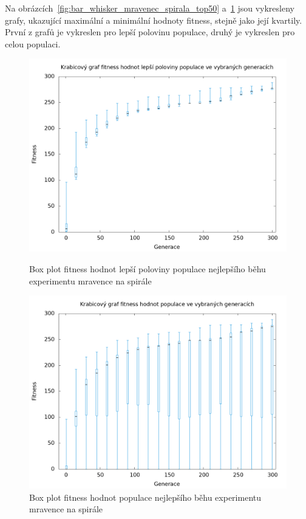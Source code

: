 Na obrázcích~\ref{fig:bar_whisker_mravenec_spirala_top50} a~\ref{fig:bar_whisker_mravenec_spirala} jsou vykresleny grafy, ukazující maximální a minimální hodnoty fitness, stejně jako její kvartily.
První z grafů je vykreslen pro lepší polovinu populace, druhý je vykreslen pro celou populaci.

\begin{figure}[h]
    \begin{minipage}[c]{0.48\linewidth}
        \includegraphics[width=\linewidth]{obrazky/bar_whisker_mravenec_spirala_top50.png}
        \caption{Box plot fitness hodnot lepší poloviny populace nejlepšího běhu experimentu mravence na spirále}
        \label{fig:bar_whisker_mravenec_spirala_top50}
    \end{minipage}
    \hfill
    \begin{minipage}[c]{0.48\linewidth}
        \includegraphics[width=\linewidth]{obrazky/bar_whisker_mravenec_spirala.png}
        \caption{Box plot fitness hodnot populace nejlepšího běhu experimentu mravence na spirále}
        \label{fig:bar_whisker_mravenec_spirala}
    \end{minipage}
\end{figure}

